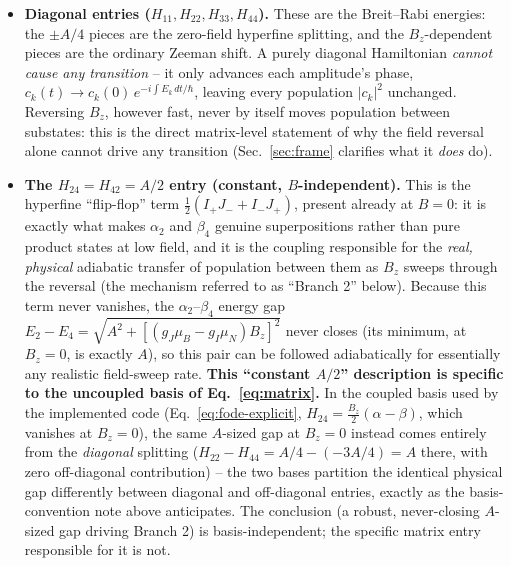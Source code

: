 \documentclass[11pt,a4paper]{article}
\begin{document}
\begin{itemize}
    \item \textbf{Diagonal entries ($H_{11},H_{22},H_{33},H_{44}$).} These
    are the Breit--Rabi energies: the $\pm A/4$ pieces are the zero-field
    hyperfine splitting, and the $B_z$-dependent pieces are the ordinary
    Zeeman shift. A purely diagonal Hamiltonian \emph{cannot cause any
    transition} -- it only advances each amplitude's phase,
    $c_k(t)\to c_k(0)\,e^{-i\int E_k\,dt/\hbar}$, leaving every population
    $|c_k|^2$ unchanged. Reversing $B_z$, however fast, never by itself
    moves population between substates: this is the direct matrix-level
    statement of why the field reversal alone cannot drive any transition
    (Sec.~\ref{sec:frame} clarifies what it \emph{does} do).

    \item \textbf{The $H_{24}=H_{42}=A/2$ entry (constant, $B$-independent).}
    This is the hyperfine ``flip-flop'' term $\tfrac12(I_+J_-+I_-J_+)$,
    present already at $B=0$: it is exactly what makes $\alpha_2$ and
    $\beta_4$ genuine superpositions rather than pure product states at low
    field, and it is the coupling responsible for the \emph{real, physical}
    adiabatic transfer of population between them as $B_z$ sweeps through
    the reversal (the mechanism referred to as ``Branch 2'' below). Because
    this term never vanishes, the $\alpha_2$--$\beta_4$ energy gap
    $E_2-E_4=\sqrt{A^2+\left[(g_J\mu_B-g_I\mu_N)B_z\right]^2}$ never closes
    (its minimum, at $B_z=0$, is exactly $A$), so this pair can be followed
    adiabatically for essentially any realistic field-sweep rate.
    \textbf{This ``constant $A/2$'' description is specific to the
    uncoupled basis of Eq.~\eqref{eq:matrix}.} In the coupled basis used by
    the implemented code (Eq.~\eqref{eq:fode-explicit}, $H_{24}=\frac{B_z}{2}(\alpha-\beta)$,
    which vanishes at $B_z=0$), the same $A$-sized gap at $B_z=0$ instead
    comes entirely from the \emph{diagonal} splitting ($H_{22}-H_{44}=A/4-(-3A/4)=A$
    there, with zero off-diagonal contribution) -- the two bases partition
    the identical physical gap differently between diagonal and
    off-diagonal entries, exactly as the basis-convention note above
    anticipates. The conclusion (a robust, never-closing $A$-sized gap
    driving Branch 2) is basis-independent; the specific matrix entry
    responsible for it is not.


\end{itemize}
\end{document}
